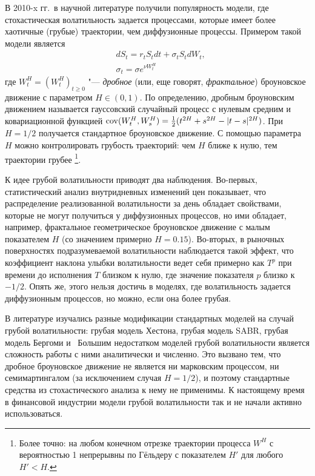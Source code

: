 В 2010-x гг.\ в научной литературе получили популярность модели, где стохастическая волатильность задается процессами, которые имеет более хаотичные (грубые) траектории, чем диффузионные процессы.
Примером такой модели является
\begin{align*}
&d S_t = r_tS_t dt + \sigma_t S_t d W_t,\\
&\sigma_t = \sigma e^{\nu W_t^H}
\end{align*}
где $W_t^H = (W_t^H)_{t\ge0}$ "--- \emph{дробное} (или, еще говорят, \emph{фрактальное}) броуновское движение с параметром $H\in(0,1)$.
По определению, дробным броуновским движением называется гауссовский случайный процесс с нулевым средним и ковариационной функцией $\operatorname{cov}(W_t^H,W_s^H) = \frac12 (t^{2H} + s^{2H} - |t-s|^{2H}) $.
При $H=1/2$ получается стандартное броуновское движение.
С помощью параметра $H$ можно контролировать грубость траекторий: чем $H$ ближе к нулю, тем траектории грубее%
\footnote{Более точно: на любом конечном отрезке траектории процесса $W^H$ с вероятностью 1 непрерывны по Гёльдеру с показателем $H'$ для любого $H' < H$.}.

К идее грубой волатильности приводят два наблюдения.
Во-первых, статистический анализ внутридневных изменений цен показывает, что распределение реализованной волатильности за день обладает свойствами, которые не могут получиться у диффузионных процессов, но ими обладает, например, фрактальное геометрическое броуновское движение с малым показателем $H$ (со значением примерно $H=0.15$).
Во-вторых, в рыночных поверхностях подразумеваемой волатильности наблюдается такой эффект, что коэффициент наклона улыбки волатильности ведет себя примерно как $T^p$ при времени до исполнения $T$ близком к нулю, где значение показателя $p$ близко к $-1/2$.
Опять же, этого нельзя достичь в моделях, где волатильность задается диффузионным процессов, но можно, если она более грубая.

В литературе изучались разные модификации стандартных моделей на случай грубой волатильности: грубая модель Хестона, грубая модель SABR, грубая модель Бергоми и \tp\ 
Большим недостатком моделей грубой волатильности является сложность работы с ними аналитически и численно.
Это вызвано тем, что дробное броуновское движение не является ни марковским процессом, ни семимартингалом (за исключением случая $H=1/2$), и поэтому стандартные средства из стохастического анализа к нему не применимы.
К настоящему время в финансовой индустрии модели грубой волатильности так и не начали активно использоваться.



